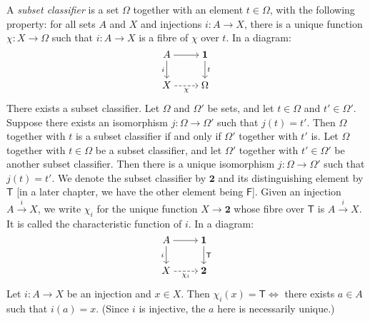  A \textit{subset classifier} is a set $\Omega$ together with an element $t \in \Omega$, with the following property: for all sets $A$ and $X$ and injections $i \colon A \to X$, there is a unique function $\chi \colon X \to \Omega$ such that $i \colon A \to X$ is a fibre of $\chi$ over $t$. In a diagram:
\[\begin{tikzcd}[cramped]
	A & {\mathbf{1}} \\
	X & \Omega
	\arrow[from=1-1, to=1-2]
	\arrow["i"', from=1-1, to=2-1]
	\arrow["t", from=1-2, to=2-2]
	\arrow["\chi"', dashed, from=2-1, to=2-2]
\end{tikzcd}\]
 There exists a subset classifier.
 Let $\Omega$ and $\Omega'$ be sets, and let $t \in \Omega$ and $t' \in \Omega'$. Suppose there exists an isomorphism $j \colon \Omega \to \Omega'$ such that $j(t) = t'$. Then $\Omega$ together with $t$ is a subset classifier if and only if $\Omega'$ together with $t'$ is.
 Let $\Omega$ together with $t \in \Omega$ be a subset classifier, and let $\Omega'$ together with $t' \in \Omega'$ be another subset classifier. Then there is a unique isomorphism $j \colon \Omega \to \Omega'$ such that $j(t) = t'$.
 We denote the subset classifier by $\mathbf{2}$ and its distinguishing element by $\textsf{T}$ [in a later chapter, we have the other element being $\mathsf{F}$]. Given an injection $A \xrightarrow{i} X$, we write $\chi_i$ for the unique function $X \to \mathbf{2}$ whose fibre over $\mathsf{T}$ is $A \xrightarrow{i} X$. It is called the characteristic function of $i$. In a diagram:
\[\begin{tikzcd}[cramped]
	A & {\mathbf{1}} \\
	X & {\mathbf{2}}
	\arrow[from=1-1, to=1-2]
	\arrow["i"', from=1-1, to=2-1]
	\arrow["{\mathsf{T}}", from=1-2, to=2-2]
	\arrow["{\chi_i}"', dashed, from=2-1, to=2-2]
\end{tikzcd}\]
 Let $i \colon A \to X$ be an injection and $x \in X$. Then $\chi_i(x) = \mathsf{T} \iff$ there exists $a \in A$ such that $i(a) = x$. (Since $i$ is injective, the $a$ here is necessarily unique.)
